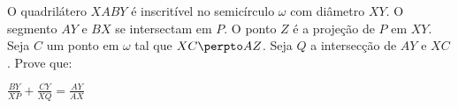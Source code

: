 O quadrilátero $XABY$ é inscritível no semicírculo $\omega$ com diâmetro $XY$. O segmento $AY$ e $BX$ se intersectam em $P$. O ponto $Z$ é a projeção de $P$ em $XY$. Seja $C$ um ponto em $\omega$ tal que $XC \perpto AZ$. Seja $Q$ a intersecção de $AY$ e $XC$. Prove que:

\begin{center}
	$\frac{BY}{XP} + \frac{CY}{XQ} = \frac{AY}{AX}$
\end{center}